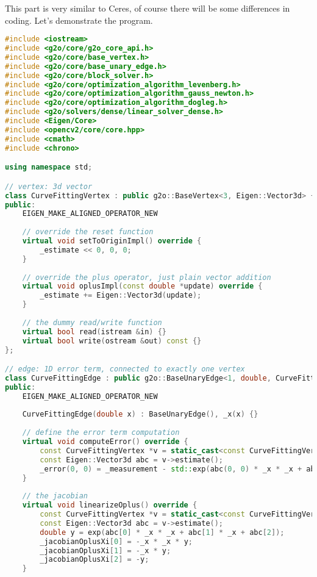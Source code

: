 This part is very similar to Ceres, of course there will be some differences in coding. Let's demonstrate the program.
\begin{lstlisting}[language=c++,caption=slambook/ch6/g2oCurveFitting.cpp]
#include <iostream>
#include <g2o/core/g2o_core_api.h>
#include <g2o/core/base_vertex.h>
#include <g2o/core/base_unary_edge.h>
#include <g2o/core/block_solver.h>
#include <g2o/core/optimization_algorithm_levenberg.h>
#include <g2o/core/optimization_algorithm_gauss_newton.h>
#include <g2o/core/optimization_algorithm_dogleg.h>
#include <g2o/solvers/dense/linear_solver_dense.h>
#include <Eigen/Core>
#include <opencv2/core/core.hpp>
#include <cmath>
#include <chrono>

using namespace std;

// vertex: 3d vector 
class CurveFittingVertex : public g2o::BaseVertex<3, Eigen::Vector3d> {
public:
    EIGEN_MAKE_ALIGNED_OPERATOR_NEW
    
    // override the reset function
    virtual void setToOriginImpl() override {
        _estimate << 0, 0, 0;
    }
    
    // override the plus operator, just plain vector addition
    virtual void oplusImpl(const double *update) override {
        _estimate += Eigen::Vector3d(update);
    }
    
    // the dummy read/write function
    virtual bool read(istream &in) {}
    virtual bool write(ostream &out) const {}
};

// edge: 1D error term, connected to exactly one vertex
class CurveFittingEdge : public g2o::BaseUnaryEdge<1, double, CurveFittingVertex> {
public:
    EIGEN_MAKE_ALIGNED_OPERATOR_NEW
    
    CurveFittingEdge(double x) : BaseUnaryEdge(), _x(x) {}
    
    // define the error term computation
    virtual void computeError() override {
        const CurveFittingVertex *v = static_cast<const CurveFittingVertex *> (_vertices[0]);
        const Eigen::Vector3d abc = v->estimate();
        _error(0, 0) = _measurement - std::exp(abc(0, 0) * _x * _x + abc(1, 0) * _x + abc(2, 0));
    }
    
    // the jacobian
    virtual void linearizeOplus() override {
        const CurveFittingVertex *v = static_cast<const CurveFittingVertex *> (_vertices[0]);
        const Eigen::Vector3d abc = v->estimate();
        double y = exp(abc[0] * _x * _x + abc[1] * _x + abc[2]);
        _jacobianOplusXi[0] = -_x * _x * y;
        _jacobianOplusXi[1] = -_x * y;
        _jacobianOplusXi[2] = -y;
    }
    

\end{lstlisting}
